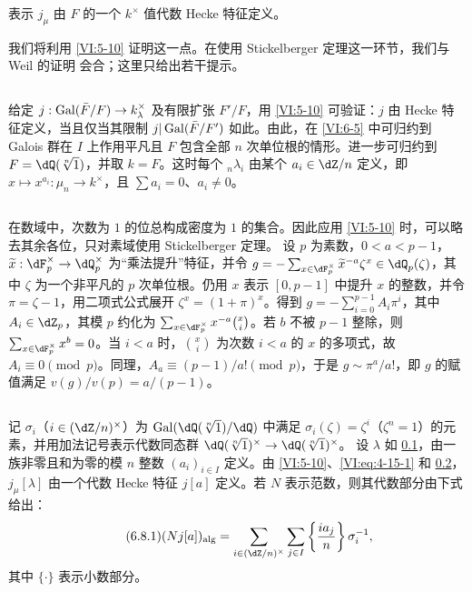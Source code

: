 \begin{theorem_}\label{VI:6-5}
表示 $j_\mu$ 由 $F$ 的一个 $k^\times$ 值代数 Hecke 特征定义。
\end{theorem_}
我们将利用 \ref{VI:5-10} 证明这一点。在使用 Stickelberger 定理这一环节，我们与 Weil 的证明 \cite{we52,we74-2} 会合；这里只给出若干提示。

\subsection{}\label{VI:6-6}
给定 $j:\operatorname{Gal}(\bar F/F)\to k_\lambda^\times$ 及有限扩张 $F'/F$，用 \ref{VI:5-10} 可验证：$j$ 由 Hecke 特征定义，当且仅当其限制 $j|\operatorname{Gal}(\bar F/F')$ 如此。由此，在 \ref{VI:6-5} 中可归约到 Galois 群在 $I$ 上作用平凡且 $F$ 包含全部 $n$ 次单位根的情形。进一步可归约到 $F=\dQ(\sqrt[n]{1})$，并取 $k=F$。这时每个 ${}_n\lambda_i$ 由某个 $a_i\in\dZ/n$ 定义，即
$x\mapsto x^{a_i}:\mu_n\to k^\times$，且 $\sum a_i=0$、$a_i\ne0$。

\subsection{}\label{VI:6-7}
在数域中，次数为 $1$ 的位总构成密度为 $1$ 的集合。因此应用 \ref{VI:5-10} 时，可以略去其余各位，只对素域使用 Stickelberger 定理。
设 $p$ 为素数，$0<a<p-1$，$\widetilde x:\dF_p^\times\to\dQ_p^\times$ 为“乘法提升”特征，并令
$g=-\sum_{x\in\dF_p^\times}\widetilde x^{-a}\zeta^x\in\dQ_p(\zeta)$，其中 $\zeta$ 为一个非平凡的 $p$ 次单位根。仍用 $x$ 表示 $[0,p-1]$ 中提升 $x$ 的整数，并令 $\pi=\zeta-1$，用二项式公式展开 $\zeta^x=(1+\pi)^x$。得到
$g=-\sum_{i=0}^{p-1}A_i\pi^i$，其中 $A_i\in\dZ_p$，其模 $p$ 约化为 $\sum_{x\in\dF_p^\times}x^{-a}\binom{x}{i}$。若 $b$ 不被 $p-1$ 整除，则
$\sum_{x\in\dF_p^\times}x^b=0$。当 $i<a$ 时，$\binom{x}{i}$ 为次数 $i<a$ 的 $x$ 的多项式，故 $A_i\equiv0\pmod p$。同理，$A_a\equiv(p-1)/a!\pmod p$，于是 $g\sim\pi^a/a!$，即 $g$ 的赋值满足
$v(g)/v(p)=a/(p-1)$。

\subsection{}\label{VI:6-8}
记 $\sigma_i$（$i\in(\dZ/n)^\times$）为 $\gal(\dQ(\sqrt[n]{1})/\dQ)$ 中满足 $\sigma_i(\zeta)=\zeta^i$（$\zeta^n=1$）的元素，并用加法记号表示代数同态群
$\dQ(\sqrt[n]{1})^\times\to\dQ(\sqrt[n]{1})^\times$。
设 $\lambda$ 如 \ref{VI:6-6}，由一族非零且和为零的模 $n$ 整数 $(a_i)_{i\in I}$ 定义。由 \ref{VI:5-10}、\eqref{VI:eq:4-15-1} 和 \ref{VI:6-7}，$j_\mu[\lambda]$ 由一个代数 Hecke 特征 $j[a]$ 定义。若 $N$ 表示范数，则其代数部分由下式给出：
\begin{equation*}\tag{6.8.1}\label{VI:eq:6-8-1}
(Nj[a])_\text{alg}
=\sum_{i\in(\dZ/n)^\times}\sum_{j\in I}
 \left\{\frac{ia_j}{n}\right\}\sigma_i^{-1},
\end{equation*}
其中 $\{\cdot\}$ 表示小数部分。

